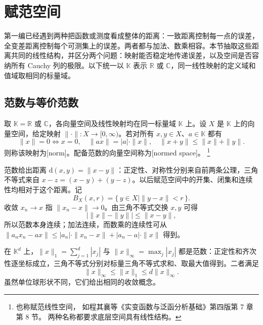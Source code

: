\section{赋范空间}
\label{b1:sec:0801}

第一编已经遇到两种把函数或测度看成整体的距离：一致距离控制每一点的误差，全变差距离控制每个可测集上的误差。两者都与加法、数乘相容。本节抽取这些距离共同的线性结构，并区分两个问题：映射能否稳定地传递误差，以及空间是否容纳所有 Cauchy 列的极限。以下统一以 \(\mathbb K\) 表示 \(\mathbb R\) 或 \(\mathbb C\)，同一线性映射的定义域和值域取相同的标量域。

\subsection{范数与等价范数}
\label{b1:subsec:080101}

\begin{definition}\label{b1:def:normed-space}
取 \(\mathbb K=\mathbb R\) 或 \(\mathbb C\)，各向量空间及线性映射均在同一标量域 \(\mathbb K\) 上。设 \(X\) 是 \(\mathbb K\) 上的向量空间，给定映射 \(\|\cdot\|:X\rightarrow[0,\infty)\)。若对所有 \(x,y\in X\)、\(a\in\mathbb K\) 都有
\[
\|x\|=0\Longleftrightarrow x=0,
\quad \|ax\|=|a|\cdot\|x\|,
\quad \|x+y\|\leq\|x\|+\|y\|.
\]
则称该映射为[norm]。配备范数的向量空间称为[normed space]。%
\footnote{也称赋范线性空间，
如程其襄等《实变函数与泛函分析基础》第四版\cite{Cheng2019ShibianFanhan}第 7 章第 8 节。
两种名称都要求底层空间具有线性结构。}
\end{definition}

范数给出距离 \(\mathrm{d}(x,y)=\|x-y\|\)：正定性、对称性分别来自前两条公理，三角不等式来自 \(x-z=(x-y)+(y-z)\)。以后赋范空间中的开集、闭集和连续性均相对于这个距离。记
\[
B_X(x,r)=\{\,y\in X\mid\|y-x\|<r\,\}.
\]
收敛 \(x_n\to x\) 指 \(\|x_n-x\|\to0\)。由三角不等式交换 \(x,y\) 可得
\[
\bigl|\|x\|-\|y\|\bigr|\leq\|x-y\|,
\]
所以范数本身连续；加法连续，而数乘的连续性可从
\(\|a_nx_n-ax\|\leq|a_n|\cdot\|x_n-x\|+|a_n-a|\cdot\|x\|\) 得到。

\ProseParagraphBreak

在 \(\mathbb K^d\) 上，\(\|x\|_1=\sum_{j=1}^d|x_j|\) 与 \(\|x\|_\infty=\max_j|x_j|\) 都是范数：正定性和齐次性逐坐标成立，三角不等式分别对标量三角不等式求和、取最大值得到。二者满足
\[
\|x\|_\infty\leq\|x\|_1\leq d\|x\|_\infty.
\]
虽然单位球形状不同，它们给出相同的收敛概念。


